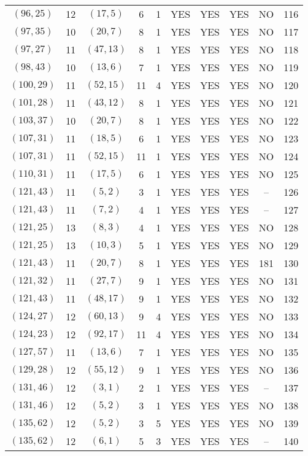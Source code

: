 \begin{longtable}{|c|c|c|c|c|c|c|c|c|c|}
$(96, 25)$ & 12 & $(17, 5)$ & 6 & 1 & YES & YES & YES & NO & 116\\
$(97, 35)$ & 10 & $(20, 7)$ & 8 & 1 & YES & YES & YES & NO & 117\\
$(97, 27)$ & 11 & $(47, 13)$ & 8 & 1 & YES & YES & YES & NO & 118\\
$(98, 43)$ & 10 & $(13, 6)$ & 7 & 1 & YES & YES & YES & NO & 119\\
$(100, 29)$ & 11 & $(52, 15)$ & 11 & 4 & YES & YES & YES & NO & 120\\
$(101, 28)$ & 11 & $(43, 12)$ & 8 & 1 & YES & YES & YES & NO & 121\\
$(103, 37)$ & 10 & $(20, 7)$ & 8 & 1 & YES & YES & YES & NO & 122\\
$(107, 31)$ & 11 & $(18, 5)$ & 6 & 1 & YES & YES & YES & NO & 123\\
$(107, 31)$ & 11 & $(52, 15)$ & 11 & 1 & YES & YES & YES & NO & 124\\
$(110, 31)$ & 11 & $(17, 5)$ & 6 & 1 & YES & YES & YES & NO & 125\\
$(121, 43)$ & 11 & $(5, 2)$ & 3 & 1 & YES & YES & YES & -- & 126\\
$(121, 43)$ & 11 & $(7, 2)$ & 4 & 1 & YES & YES & YES & -- & 127\\
$(121, 25)$ & 13 & $(8, 3)$ & 4 & 1 & YES & YES & YES & NO & 128\\
$(121, 25)$ & 13 & $(10, 3)$ & 5 & 1 & YES & YES & YES & NO & 129\\
$(121, 43)$ & 11 & $(20, 7)$ & 8 & 1 & YES & YES & YES & 181 & 130\\
$(121, 32)$ & 11 & $(27, 7)$ & 9 & 1 & YES & YES & YES & NO & 131\\
$(121, 43)$ & 11 & $(48, 17)$ & 9 & 1 & YES & YES & YES & NO & 132\\
$(124, 27)$ & 12 & $(60, 13)$ & 9 & 4 & YES & YES & YES & NO & 133\\
$(124, 23)$ & 12 & $(92, 17)$ & 11 & 4 & YES & YES & YES & NO & 134\\
$(127, 57)$ & 11 & $(13, 6)$ & 7 & 1 & YES & YES & YES & NO & 135\\
$(129, 28)$ & 12 & $(55, 12)$ & 9 & 1 & YES & YES & YES & NO & 136\\
$(131, 46)$ & 12 & $(3, 1)$ & 2 & 1 & YES & YES & YES & -- & 137\\
$(131, 46)$ & 12 & $(5, 2)$ & 3 & 1 & YES & YES & YES & NO & 138\\
$(135, 62)$ & 12 & $(5, 2)$ & 3 & 5 & YES & YES & YES & NO & 139\\
$(135, 62)$ & 12 & $(6, 1)$ & 5 & 3 & YES & YES & YES & -- & 140\\

\end{longtable}

